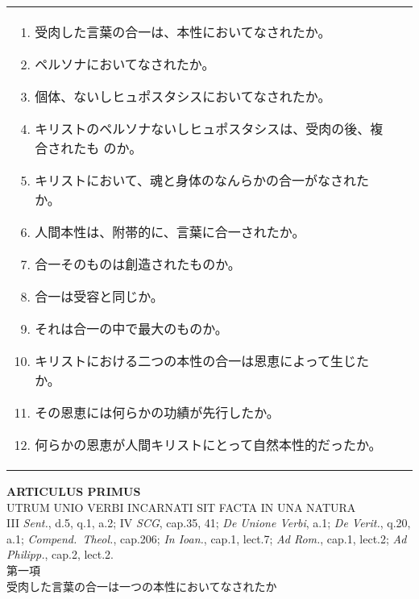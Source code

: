 \documentclass[10pt]{jsarticle} %
\begin{document}
\begin{longtable}{p{21em}p{21em}}
\begin{enumerate}
 \item 受肉した言葉の合一は、本性においてなされたか。
 \item ペルソナにおいてなされたか。
 \item 個体、ないしヒュポスタシスにおいてなされたか。
 \item キリストのペルソナないしヒュポスタシスは、受肉の後、複合されたも
       のか。
 \item キリストにおいて、魂と身体のなんらかの合一がなされたか。
 \item 人間本性は、附帯的に、言葉に合一されたか。
 \item 合一そのものは創造されたものか。
 \item 合一は受容と同じか。
 \item それは合一の中で最大のものか。
 \item キリストにおける二つの本性の合一は恩恵によって生じたか。
 \item その恩恵には何らかの功績が先行したか。
 \item 何らかの恩恵が人間キリストにとって自然本性的だったか。
\end{enumerate}
\end{longtable}
\newpage


\begin{center}
 {\Large {\bf ARTICULUS PRIMUS}}\\
 {\large UTRUM UNIO VERBI INCARNATI SIT FACTA IN UNA NATURA}\\
 {\footnotesize III {\itshape Sent.}, d.5, q.1, a.2; IV {\itshape SCG},
 cap.35, 41; {\itshape De Unione Verbi}, a.1; {\itshape De Verit.},
 q.20, a.1; {\itshape Compend.~Theol.}, cap.206; {\itshape In Ioan.},
 cap.1, lect.7; {\itshape Ad Rom.}, cap.1, lect.2; {\itshape Ad
 Philipp.}, cap.2, lect.2.}\\
 {\Large 第一項\\受肉した言葉の合一は一つの本性においてなされたか}
\end{center}
\end{document}
